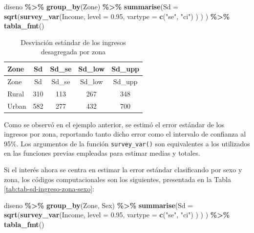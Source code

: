 \documentclass[
  spanish,
  12pt,
]{book}
\newenvironment{Shaded}{\begin{snugshade}}{\end{snugshade}}
\newcommand{\AttributeTok}[1]{\textcolor[rgb]{0.13,0.29,0.53}{#1}}
\newcommand{\FloatTok}[1]{\textcolor[rgb]{0.00,0.00,0.81}{#1}}
\newcommand{\FunctionTok}[1]{\textcolor[rgb]{0.13,0.29,0.53}{\textbf{#1}}}
\newcommand{\NormalTok}[1]{#1}
\newcommand{\SpecialCharTok}[1]{\textcolor[rgb]{0.81,0.36,0.00}{\textbf{#1}}}
\newcommand{\StringTok}[1]{\textcolor[rgb]{0.31,0.60,0.02}{#1}}
\begin{document}
\begin{Shaded}
\begin{Highlighting}[]
\NormalTok{diseno }\SpecialCharTok{\%\textgreater{}\%} 
  \FunctionTok{group\_by}\NormalTok{(Zone) }\SpecialCharTok{\%\textgreater{}\%}
  \FunctionTok{summarise}\NormalTok{(}\AttributeTok{Sd =} \FunctionTok{sqrt}\NormalTok{(}\FunctionTok{survey\_var}\NormalTok{(Income,}
                               \AttributeTok{level =} \FloatTok{0.95}\NormalTok{,}
                               \AttributeTok{vartype =}  \FunctionTok{c}\NormalTok{(}\StringTok{"se"}\NormalTok{, }\StringTok{"ci"}\NormalTok{)}
\NormalTok{                               ) }
\NormalTok{                      )}
\NormalTok{            ) }\SpecialCharTok{\%\textgreater{}\%}
  \FunctionTok{tabla\_fmt}\NormalTok{()}
\end{Highlighting}
\end{Shaded}

\begin{longtable}[]{@{}lcccc@{}}
\caption{\label{tab:tab-sd-ingreso-zona}Desviación estándar de los ingresos desagregada por zona}\tabularnewline
\toprule\noalign{}
Zone & Sd & Sd\_se & Sd\_low & Sd\_upp \\
\midrule\noalign{}
\endfirsthead
\toprule\noalign{}
Zone & Sd & Sd\_se & Sd\_low & Sd\_upp \\
\midrule\noalign{}
\endhead
\bottomrule\noalign{}
\endlastfoot
Rural & 310 & 113 & 267 & 348 \\
Urban & 582 & 277 & 432 & 700 \\
\end{longtable}

Como se observó en el ejemplo anterior, se estimó el error estándar de los ingresos por zona, reportando tanto dicho error como el intervalo de confianza al 95\%. Los argumentos de la función \texttt{survey\_var()} son equivalentes a los utilizados en las funciones previas empleadas para estimar medias y totales.

Si el interés ahora se centra en estimar la error estándar clasificando por sexo y zona, los códigos computacionales son los siguientes, presentada en la Tabla \ref{tab:tab-sd-ingreso-zona-sexo}:

\begin{Shaded}
\begin{Highlighting}[]
\NormalTok{diseno }\SpecialCharTok{\%\textgreater{}\%} 
  \FunctionTok{group\_by}\NormalTok{(Zone, Sex) }\SpecialCharTok{\%\textgreater{}\%}
  \FunctionTok{summarise}\NormalTok{(}\AttributeTok{Sd =} \FunctionTok{sqrt}\NormalTok{(}\FunctionTok{survey\_var}\NormalTok{(Income,}
                                 \AttributeTok{level =} \FloatTok{0.95}\NormalTok{,}
                                 \AttributeTok{vartype =}  \FunctionTok{c}\NormalTok{(}\StringTok{"se"}\NormalTok{, }\StringTok{"ci"}\NormalTok{)}
\NormalTok{                                 )}
\NormalTok{                      )}
\NormalTok{            ) }\SpecialCharTok{\%\textgreater{}\%}
  \FunctionTok{tabla\_fmt}\NormalTok{()}
\end{Highlighting}
\end{Shaded}
\end{document}

